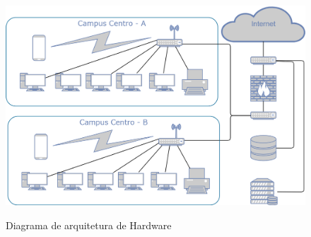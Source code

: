             \begin{figure}[htbp]\centering
                \caption{Diagrama de arquitetura de Hardware}
                \includegraphics[angle=0,scale=0.3]{Pictures/JV/Arquitetura de Hardware.png}
                \label{Diagrama_de_Hardware}
            \end{figure}    %
        
    
